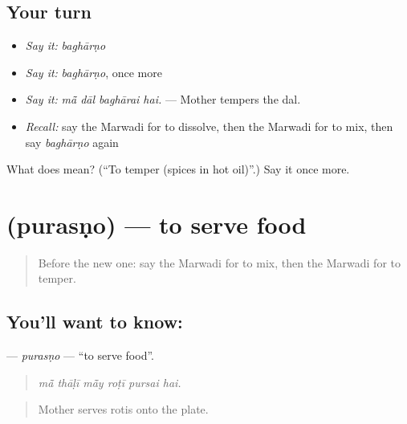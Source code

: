 \subsection*{Your turn}
\begin{itemize}
\raggedright
  \item \emph{Say it:} \emph{baghārṇo}
  \item \emph{Say it:} \emph{baghārṇo}, once more
  \item \emph{Say it:} \emph{mā̃ dāl baghārai hai.} — Mother tempers the dal.
  \item \emph{Recall:} say the Marwadi for to dissolve, then the Marwadi for to mix, then say \emph{baghārṇo} again
\end{itemize}

\begin{tcolorbox}[breakable,colback=teal!4,colframe=teal!35!black,title={Before you move on}]
What does  mean? (\textquotedblleft{}To temper (spices in hot oil)\textquotedblright{}.) Say it once more.
\end{tcolorbox}
\section[\texorpdfstring{\mw{पुरसणो} (purasṇo)}{पुरसणो (purasṇo)}]{ (purasṇo) — to serve food}

\label{lesson:MW-C182-purasno}



\begin{quote}
Before the new one: say the Marwadi for to mix, then the Marwadi for to temper.
\end{quote}

\subsection*{You'll want to know: }
\textbf{} — \emph{purasṇo} — \textquotedblleft{}to serve food\textquotedblright{}.

\begin{quote}
     
\end{quote}

\begin{quote}
\emph{mā̃ thāḷī mā̃y roṭī pursai hai.}
\end{quote}

\begin{quote}
Mother serves rotis onto the plate.
\end{quote}

